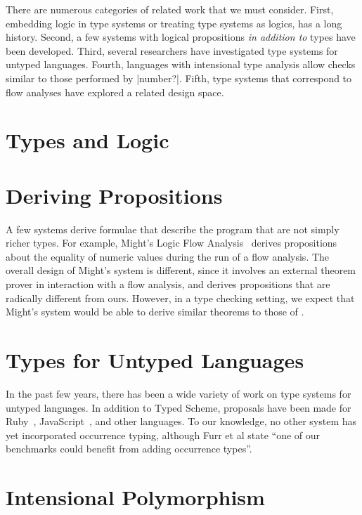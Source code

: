 
There are numerous  categories of related work that we must
consider.  First, embedding logic in type systems or treating type
systems as logics, has a long history.  Second, a few systems with
logical propositions \emph{in addition to} types have been developed.
Third, several researchers have investigated type systems for
untyped languages.  Fourth, languages with intensional type analysis
allow checks similar to those performed by \scheme|number?|.
 Fifth, type systems that correspond to flow
analyses have explored a related design space.


\section{Types and Logic}

\section{Deriving Propositions}
A few systems derive formulae that describe the program that are
not simply richer types.  For example, Might's Logic Flow
Analysis~\cite{might:lfa} derives propositions about the equality of
numeric values during the run of a flow analysis. The overall design of
Might's system is different, since it involves an external
theorem prover in interaction with a flow analysis, and derives
propositions that are radically different from ours.  However, in a type
checking setting, we expect that Might's system would be able to
derive similar theorems to those of \lts.  

\section{Types for Untyped Languages}

In the past few years, there has been a wide variety of work on type
systems for untyped languages.  In addition to Typed Scheme, proposals
have been made for Ruby~\cite{ruby-static09}, JavaScript~\cite{ecma}, and
other languages.  To our knowledge, no other system has yet
incorporated occurrence typing, although Furr et al state ``one of our
benchmarks could benefit from adding occurrence types''.  

\section{Intensional Polymorphism}

